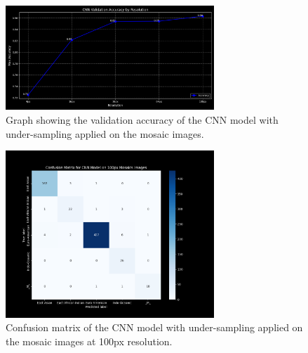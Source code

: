 \begin{appendices}
	\begin{figure}[htbp!]
		\centering
		\includegraphics[width=0.7\textwidth]{../imgs/graphs/kfold/cnn_validation_accuracy_kfold_mosaics_line_mask_5_aug.png}
		\caption{Graph showing the validation accuracy of the CNN model with under-sampling applied on the mosaic images.}
		\label{fig:augmentation_accuracy_mosaic}
	\end{figure}

	\begin{figure}[htbp!]
		\centering
		\includegraphics[width=0.7\textwidth]{../imgs/graphs/kfold/cnn_confusion_matrix_kfold_mosaics_100px_mask_5_aug.png}
		\caption{Confusion matrix of the CNN model with under-sampling applied on the mosaic images at 100px resolution.}
		\label{fig:augmentation_confusion_matrix_mosaic}
	\end{figure}



\end{appendices}
